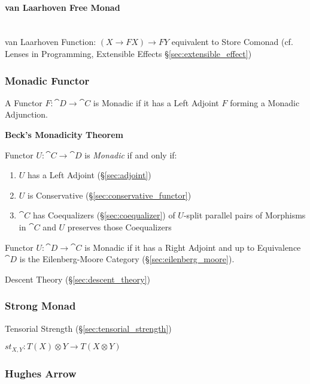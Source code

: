 \paragraph{van Laarhoven Free Monad}
\label{sec:vanlaarhoven_free_monad}
\hfill \\

van Laarhoven Function: $(X \rightarrow F X) \rightarrow F Y$
equivalent to Store Comonad (cf. Lenses in Programming, Extensible
Effects \S\ref{sec:extensible_effect})



\subsubsection{Monadic Functor}\label{sec:monadic_functor}

A Functor $F : \cat{D} \rightarrow \cat{C}$ is Monadic if it has
a Left Adjoint $F$ forming a Monadic Adjunction.

\textbf{Beck's Monadicity Theorem}

Functor $U : \cat{C} \rightarrow \cat{D}$ is \emph{Monadic} if
and only if:
\begin{enumerate}
  \item $U$ has a Left Adjoint (\S\ref{sec:adjoint})
  \item $U$ is Conservative (\S\ref{sec:conservative_functor})
  \item $\cat{C}$ has Coequalizers (\S\ref{sec:coequalizer}) of
    $U$-split parallel pairs of Morphisms in $\cat{C}$ and $U$
    preserves those Coequalizers
\end{enumerate}

Functor $U : \cat{D} \rightarrow \cat{C}$ is Monadic if it has a
Right Adjoint and up to Equivalence $\cat{D}$ is the
Eilenberg-Moore Category (\S\ref{sec:eilenberg_moore}).
\cite{lambek-scott88}

Descent Theory (\S\ref{sec:descent_theory})



\subsubsection{Strong Monad}\label{sec:strong_monad}

Tensorial Strength (\S\ref{sec:tensorial_strength})

$st_{X,Y} : T(X) \otimes Y \rightarrow T(X \otimes Y)$



\subsubsection{Hughes Arrow}\label{sec:hughes_arrow}

